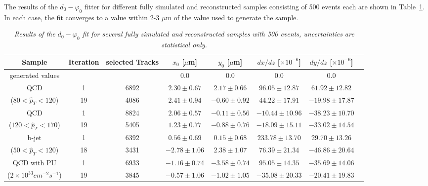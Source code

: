 \documentclass{cmspaper}
\begin{document}
The results of the $d_0-\varphi_0$ fitter for different
fully simulated and reconstructed samples consisting of 500 events each 
are shown in Table~\ref{d0phiresultsfullsim}. In each case, the fit converges to a value 
within 2-3 $\mu$m of the value used to generate the sample.  


 
\begin{table} [th]
\caption{\it \label{d0phiresultsfullsim} Results of the $d_0
- \varphi_0$ fit for several
fully simulated and reconstructed samples with 500 events, uncertainties are statistical only.}
\begin{center}
\small
\begin{tabular}{|c|c|c|c|c|c|c|c|} \hline
Sample & Iteration & selected Tracks           & $x_0$ [$\mu$m] &
$y_0$ [$\mu$m] & $dx/dz$ [$\times10^{-6}$] & $dy/dz$
[$\times10^{-6}$] \\ \hline\hline
generated values                  &     &       & $0.0$             & $0.0$             & $0.0$               & $ 0.0$              \\ \hline
QCD                               &  1  & 6892  & $2.30   \pm 0.67$ & $2.17  \pm 0.66$  & $96.05   \pm 12.87$ & $61.92  \pm 12.82$  \\
($80<\hat{p}_T<120$)              & 19  & 4086  & $2.41   \pm 0.94$ & $-0.60 \pm 0.92$  & $44.22   \pm 17.91$ & $-19.98 \pm 17.87$  \\ \hline
QCD                               &  1  & 8824  & $2.06   \pm 0.57$ & $-0.11 \pm 0.56$  & $-10.44  \pm 10.96$ & $-38.23 \pm 10.70$  \\
($120<\hat{p}_T<170$)             & 19  & 5405  & $1.23   \pm 0.77$ & $-0.88 \pm 0.76$  & $-18.09  \pm 15.11$ & $-33.02 \pm 14.54$  \\ \hline
b-jet                             &  1  & 6392  & $0.56   \pm 0.69$ & $0.15  \pm 0.68$  & $233.78  \pm 13.70$ & $29.70  \pm 13.26$  \\
($50<\hat{p}_T<120$)              & 18  & 3431  & $-2.78  \pm 1.06$ & $2.38  \pm 1.07$  & $76.39   \pm 21.34$ & $-46.86 \pm 20.64$  \\ \hline
QCD with PU                       &  1  & 6933  & $-1.16  \pm 0.74$ & $-3.58 \pm 0.74$  & $95.05   \pm 14.35$ & $-35.69 \pm 14.06$  \\
($2\times10^{33}cm^{-2} s^{-1}$)  & 19  & 3845  & $-0.57  \pm 1.06$ & $-1.02 \pm 1.05$  & $-35.08  \pm 20.33$ & $-20.41 \pm 19.83$  \\ 

\end{tabular}
\end{center}
\end{table}
\end{document}
